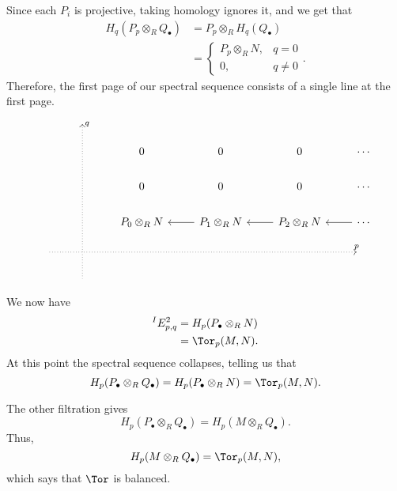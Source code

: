 \documentclass[main.tex]{subfiles}
\begin{document}
\begin{example}
  Since each $P_{i}$ is projective, taking homology ignores it, and we get that
  \begin{align*}
    H_{q}(P_{p} \otimes_{R} Q_{\bullet}) &= P_{p} \otimes_{R} H_{q}(Q_{\bullet}) \\
    &=
    \begin{cases}
      P_{p} \otimes_{R} N, & q = 0 \\
      0, & q \neq 0
    \end{cases}.
  \end{align*}
  Therefore, the first page of our spectral sequence consists of a single line at the first page.
  \begin{equation*}
    \begin{tikzcd}
      & \
      \arrow[ddddd, leftarrow, dotted, at start, "q"]
      \\
      && 0
      & 0
      & 0
      & \cdots
      \\
      && 0
      & 0
      & 0
      & \cdots
      \\
      && P_{0} \otimes_{R} N
      & P_{1} \otimes_{R} N
      \arrow[l]
      & P_{2} \otimes_{R} N
      \arrow[l]
      & \cdots
      \arrow[l]
      \\
      \
      \arrow[rrrrr, dotted, at end, "p"]
      &&&&& \
      \\
      & \
    \end{tikzcd}
  \end{equation*}
  We now have
  \begin{align*}
    ^{I}E^{2}_{p,q} &= H_{p}(P_{\bullet} \otimes_{R} N) \\
    &= \Tor_{p}(M, N).
  \end{align*}
  At this point the spectral sequence collapses, telling us that
  \begin{equation*}
    H_{p}(P_{\bullet} \otimes_{R} Q_{\bullet}) = H_{p}(P_{\bullet} \otimes_{R} N) = \Tor_{p}(M, N).
  \end{equation*}

  The other filtration gives
  \begin{equation*}
    H_{p}(P_{\bullet} \otimes_{R} Q_{\bullet}) = H_{p}(M \otimes_{R} Q_{\bullet}).
  \end{equation*}
  Thus,
  \begin{equation*}
    H_{p}(M \otimes_{R} Q_{\bullet}) = \Tor_{p}(M, N),
  \end{equation*}
  which says that $\Tor$ is balanced.
\end{example}
\end{document}
